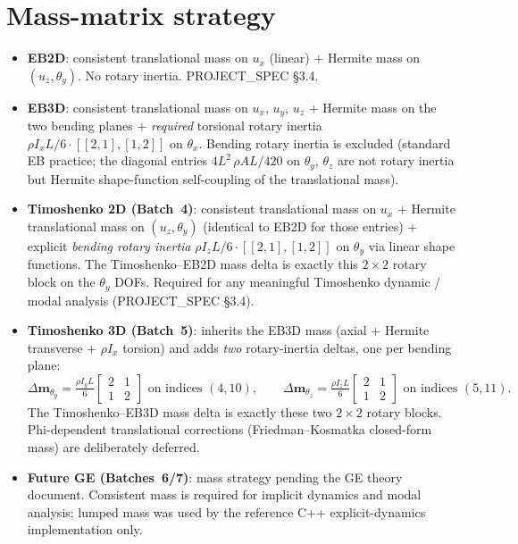 \documentclass[11pt,a4paper]{book}
\newcommand{\bmath}[1]{\boldsymbol{#1}}
\begin{document}
\section{Mass-matrix strategy}\label{sec:mass-strategy}

\begin{itemize}[leftmargin=*]
    \item \textbf{EB2D}: consistent translational mass on $u_x$ (linear) + Hermite mass on $(u_z, \theta_y)$. No rotary inertia. PROJECT\_SPEC \S3.4.
    \item \textbf{EB3D}: consistent translational mass on $u_x$, $u_y$, $u_z$ + Hermite mass on the two bending planes + \emph{required} torsional rotary inertia $\rho I_x L/6 \cdot [[2,1],[1,2]]$ on $\theta_x$. Bending rotary inertia is excluded (standard EB practice; the diagonal entries $4L^2\,\rho A L/420$ on $\theta_y$, $\theta_z$ are not rotary inertia but Hermite shape-function self-coupling of the translational mass).
    \item \textbf{Timoshenko 2D (Batch~4)}: consistent translational mass on $u_x$ + Hermite translational mass on $(u_z, \theta_y)$ (identical to EB2D for those entries) + explicit \emph{bending rotary inertia} $\rho I_z L / 6 \cdot [[2,1],[1,2]]$ on $\theta_y$ via linear shape functions. The Timoshenko--EB2D mass delta is exactly this $2\times 2$ rotary block on the $\theta_y$ DOFs. Required for any meaningful Timoshenko dynamic / modal analysis (PROJECT\_SPEC \S3.4).
    \item \textbf{Timoshenko 3D (Batch~5)}: inherits the EB3D mass (axial + Hermite transverse + $\rho I_x$ torsion) and adds \emph{two} rotary-inertia deltas, one per bending plane:
    \[
    \Delta\bmath{m}_{\theta_y} = \tfrac{\rho I_y L}{6}\begin{bmatrix}2&1\\1&2\end{bmatrix} \text{ on indices } (4, 10),
    \qquad
    \Delta\bmath{m}_{\theta_z} = \tfrac{\rho I_z L}{6}\begin{bmatrix}2&1\\1&2\end{bmatrix} \text{ on indices } (5, 11).
    \]
    The Timoshenko--EB3D mass delta is exactly these two $2\times 2$ rotary blocks. Phi-dependent translational corrections (Friedman--Kosmatka closed-form mass) are deliberately deferred.
    \item \textbf{Future GE (Batches~6/7)}: mass strategy pending the GE theory document. Consistent mass is required for implicit dynamics and modal analysis; lumped mass was used by the reference C++ explicit-dynamics implementation only.
\end{itemize}
\end{document}
